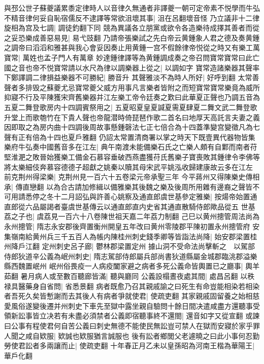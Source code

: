 與邳公世子蘇夔議累黍定律時人以音律久無通者非譯夔一朝可定帝素不悦學而牛弘不精音律何妥自恥宿儒反不逮譯等常欲沮壞其事|{
	沮在呂翻壞音怪}
乃立議非十二律旋相為宫及七調|{
	調徒釣翻下同}
競為異議各立朋黨或欲令各造樂待成擇其善者而從之妥恐樂成善惡易見|{
	易弋豉翻}
乃請帝張樂試之先白帝云黄鍾象人君之德及奏黄鍾之調帝曰滔滔和雅甚與我心會妥因奏止用黄鍾一宫不假餘律帝悦從之時又有樂工萬寶常|{
	萬姓也孟子門人有萬章}
妙達鍾律譯等為黄鍾調成奏之帝召問寶常寶常曰此亡國之音也帝不悦寶常請以水尺為律以調樂器上從之|{
	以調如字}
寶常造諸樂器其聲率下鄭譯調二律損益樂器不可勝紀|{
	勝音升}
其聲雅淡不為時人所好|{
	好呼到翻}
太常善聲者多排毁之蘇夔尤忌寶常夔父威方用事凡言樂者皆附之而短寶常寶常樂竟為威所抑寢不行及平陳獲宋齊舊樂器并江左樂工帝令廷奏之歎曰此華夏正聲也乃調五音為五夏二舞登歌房内十四調賓祭用之|{
	五夏昭夏皇夏諴夏需夏肆夏二舞文武二舞登歌升堂上而歌匏竹在下貴人聲也帝龍潜時倚琵琶作歌二首名曰地厚天高託言夫妻之義因即取之為房内曲十四調後周故事懸鍾磬法七正七倍合為十四蓋準變宫變徵凡為七聲有正有倍為十四也夏戶雅翻}
仍詔太常置清商署以掌之時天下既壹異代器物皆集樂府牛弘奏中國舊音多在江左|{
	典午南渡未能備樂石氏之亡樂人頗有自鄴而南者苻堅淮淝之敗晉始獲樂工備金石慕容垂破西燕盡獲苻氏舊樂子寶喪敗其鍾律令李佛等將太樂細伎奔慕容德德子超獻之姚秦以贖其母宋武平姚泓收歸建康故云多在江左}
前克荆州得梁樂|{
	克荆州見一百六十五卷梁元帝承聖三年}
今平蔣州又得陳樂史傳相承|{
	傳直戀翻}
以為合古請加修緝以備雅樂其後魏之樂及後周所用雜有邊裔之聲皆不可用請悉停之冬十二月詔弘與許善心姚察及通直郎虞世基參定雅樂|{
	按煬帝始置通直郎從六品屬謁者臺虞世基傳云以通直郎直内史省其通直散騎侍郎歟品從五}
世基荔之子也|{
	虞荔見一百六十八卷陳世祖天嘉二年荔力制翻}
己巳以黄州摠管周法尚為永州摠管|{
	隋志永安郡後齊置衡州開皇五年改曰黄州零陵郡平陳初置永州摠管府}
安集嶺南給黄州兵三千五百人為帳内陳桂州刺史錢季卿等皆詣法尚降|{
	始安郡梁置桂州降戶江翻}
定州刺史呂子廊|{
	鬱林郡梁置定州}
據山洞不受命法尚擊斬之　以駕部侍郎狄道辛公義為岷州刺史|{
	隋志駕部侍郎屬兵部尚書狄道縣屬金城郡臨洮郡溢樂縣西魏置岷州}
岷州俗畏疫一人病疫闔家避之病者多死公義命皆輿置已之廳事|{
	輿羊茹翻}
暑月病人或至數百聽廊皆滿|{
	聽與廳同}
公義設榻晝夜處其間|{
	處昌呂翻}
以秩禄具醫藥身自省問|{
	省悉景翻}
病者既愈乃召其親戚諭之曰死生有命豈能相染若相染者吾死久矣皆慙謝而去其後人有病者爭就使君|{
	使疏吏翻}
其家親戚固留養之始相慈愛風俗遂變後遷并州刺史下車先至獄中露坐親自驗問十餘日間决遣咸盡方還聽事受領新訟事皆立决若有未盡必須禁者公義即宿聽事終不還閤|{
	還音如字又從宣翻}
或諫曰公事有程使君何自苦公義曰刺史無德不能使民無訟豈可禁人在獄而安寢於家乎罪人聞之咸自欵服|{
	欵誠也欵服猶言誠服也}
後有訟者鄉閭父老遽曉之曰此小事何忍勤勞使君訟者多兩讓而止|{
	使疏吏翻}
十年春正月乙未以皇孫昭為河南王楷為華陽王|{
	華戶化翻}
